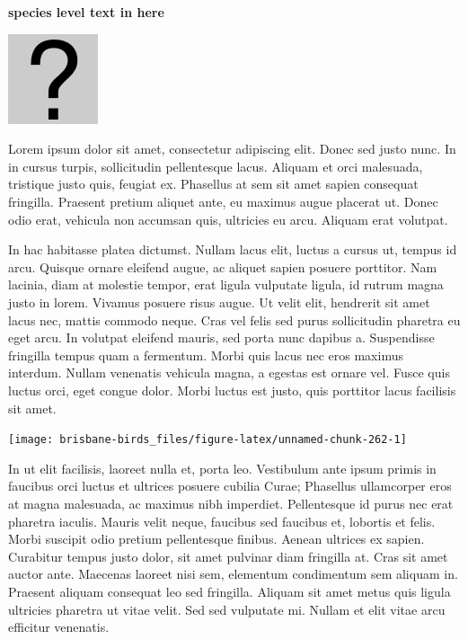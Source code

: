 \documentclass[]{book}
\let\origfigure\figure
\let\endorigfigure\endfigure
\renewenvironment{figure}[1][2] {
  \expandafter\origfigure\expandafter[H]
} {
  \endorigfigure
}
\begin{document}
\textbf{species level text in here}

\begin{figure}
\centering
\includegraphics{assets/missing.png}
\caption{No image for species}
\end{figure}

Lorem ipsum dolor sit amet, consectetur adipiscing elit. Donec sed justo
nunc. In in cursus turpis, sollicitudin pellentesque lacus. Aliquam et
orci malesuada, tristique justo quis, feugiat ex. Phasellus at sem sit
amet sapien consequat fringilla. Praesent pretium aliquet ante, eu
maximus augue placerat ut. Donec odio erat, vehicula non accumsan quis,
ultricies eu arcu. Aliquam erat volutpat.

In hac habitasse platea dictumst. Nullam lacus elit, luctus a cursus ut,
tempus id arcu. Quisque ornare eleifend augue, ac aliquet sapien posuere
porttitor. Nam lacinia, diam at molestie tempor, erat ligula vulputate
ligula, id rutrum magna justo in lorem. Vivamus posuere risus augue. Ut
velit elit, hendrerit sit amet lacus nec, mattis commodo neque. Cras vel
felis sed purus sollicitudin pharetra eu eget arcu. In volutpat eleifend
mauris, sed porta nunc dapibus a. Suspendisse fringilla tempus quam a
fermentum. Morbi quis lacus nec eros maximus interdum. Nullam venenatis
vehicula magna, a egestas est ornare vel. Fusce quis luctus orci, eget
congue dolor. Morbi luctus est justo, quis porttitor lacus facilisis sit
amet.

\begin{figure}
\texttt{[image: brisbane-birds\_files/figure-latex/unnamed-chunk-262-1]} \caption{insert figure caption}\label{fig:unnamed-chunk-262}
\end{figure}

In ut elit facilisis, laoreet nulla et, porta leo. Vestibulum ante ipsum
primis in faucibus orci luctus et ultrices posuere cubilia Curae;
Phasellus ullamcorper eros at magna malesuada, ac maximus nibh
imperdiet. Pellentesque id purus nec erat pharetra iaculis. Mauris velit
neque, faucibus sed faucibus et, lobortis et felis. Morbi suscipit odio
pretium pellentesque finibus. Aenean ultrices ex sapien. Curabitur
tempus justo dolor, sit amet pulvinar diam fringilla at. Cras sit amet
auctor ante. Maecenas laoreet nisi sem, elementum condimentum sem
aliquam in. Praesent aliquam consequat leo sed fringilla. Aliquam sit
amet metus quis ligula ultricies pharetra ut vitae velit. Sed sed
vulputate mi. Nullam et elit vitae arcu efficitur venenatis.
\end{document}
